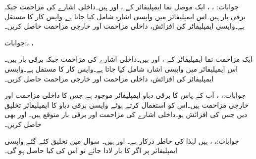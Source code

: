 جوابات: ، ، 
ایک موصل نما ایمپلیفائر کے ،  اور
  ہیں۔داخلی اشارے کی مزاحمت  جبکہ برقی بار  ہیں۔اس ایمپلیفائر میں واپسی اشارہ شامل کیا جاتا ہے۔واپس کار کا مستقل  ہے۔واپسی ایمپلیفائر کی افزائش، داخلی مزاحمت اور خارجی مزاحمت حاصل کریں۔

جوابات:، ، 

ایک مزاحمت نما ایمپلیفائر کے ،  اور
  ہیں۔داخلی اشارے کی مزاحمت  جبکہ برقی بار  ہیں۔اس ایمپلیفائر میں واپسی اشارہ شامل کیا جاتا ہے۔واپس کار کا مستقل  ہے۔واپسی ایمپلیفائر کی افزائش، داخلی مزاحمت اور خارجی مزاحمت حاصل کریں۔

جوابات:، ، 
آپ کے پاس  کا برقی دباو ایمپلیفائر موجود ہے جس کا داخلی مزاحمت  اور خارجی مزاحمت  ہیں۔اس کو استعمال کرتے ہوئے واپسی برقی دباو کا ایمپلیفائر تخلیق دیں جس کی افزائش  ہو۔داخلی اشارے کی مزاحمت  اور برقی بار  متوقع ہیں۔ اور  بھی حاصل کریں۔

جوابات:، ،  ہیں لہٰذا  کی خاطر  درکار ہے۔ اور  ہیں۔
سوال  میں تخلیق کئے گئے واپسی ایمپلیفائر پر اگر  کا بار لادا جائے تو اس کی  کیا حاصل ہو گی۔

